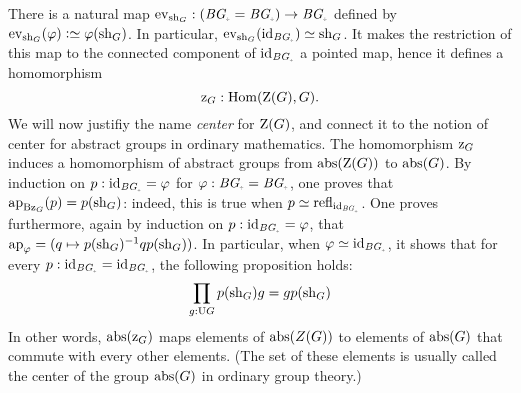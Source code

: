 There is a natural map
$\ev_{\sh_G} : (\BG_\div=\BG_\div) \to \BG_\div$ defined by
$\ev_{\sh_G}(\varphi)\defequi \varphi(\sh_G)$. In particular,
$\ev_{\sh_G}(\id_{\BG_\div}) \jdeq \sh_G$. It makes the restriction
of this map to the connected component of $\id_{\BG_\div}$ a
pointed map, hence it defines a homomorphism
\begin{displaymath}
  \grpcenterinc G : \Hom(\grpcenter(G), G).
\end{displaymath}
We will now justifiy the name {\em center} for $\grpcenter(G)$, and
connect it to the notion of center for abstract groups in ordinary
mathematics. The homomorphism $\mathrm z_{{G}}$ induces a homomorphism
of abstract groups from $\abstr(\grpcenter(G))$ to $\mathrm{abs}(G)$. By
induction on $p:\id_{\BG_\div} = \varphi$ for
$\varphi:\BG_\div=\BG_\div$, one proves that
$\ap{\B \grpcenterinc G}(p) = p(\sh_G)$: indeed, this is true when
$p\jdeq \refl {\id_{\BG_\div}}$. One proves furthermore, again by
induction on $p:\id_{\BG_\div} = \varphi$, that
$\ap \varphi = (q\mapsto \inv{p(\sh_G)} q p(\sh_G))$. In particular,
when $\varphi \jdeq \id_{\BG_\div}$, it shows that for every
$p:\id_{\BG_\div}=\id_{\BG_\div}$, the following proposition
holds:
\begin{displaymath}
  \prod_{g:\mathrm{U} G }p(\mathrm{sh}_G) g = g p(\mathrm{sh}_G)
\end{displaymath}
In other words, $\mathrm{abs}{(\mathrm z_{{G}})}$ maps elements of
$\mathrm{abs}(Z(G))$ to elements of $\mathrm{abs}(G)$ that commute with every
other elements. (The set of these elements is usually called the
center of the group $\mathrm{abs}(G)$ in ordinary group theory.)

